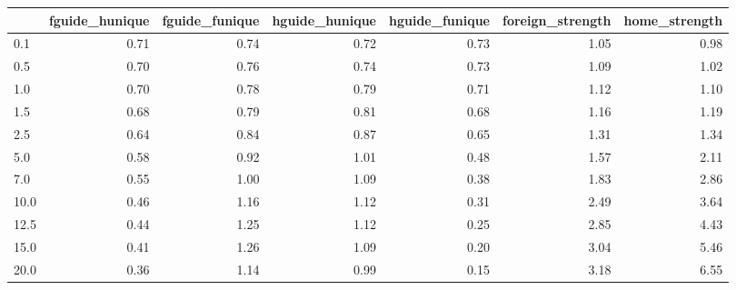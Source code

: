\begin{tabular}{lrrrrrr}
\toprule
 & fguide_hunique & fguide_funique & hguide_hunique & hguide_funique & foreign_strength & home_strength \\
\midrule
0.1 & 0.71 & 0.74 & 0.72 & 0.73 & 1.05 & 0.98 \\
0.5 & 0.70 & 0.76 & 0.74 & 0.73 & 1.09 & 1.02 \\
1.0 & 0.70 & 0.78 & 0.79 & 0.71 & 1.12 & 1.10 \\
1.5 & 0.68 & 0.79 & 0.81 & 0.68 & 1.16 & 1.19 \\
2.5 & 0.64 & 0.84 & 0.87 & 0.65 & 1.31 & 1.34 \\
5.0 & 0.58 & 0.92 & 1.01 & 0.48 & 1.57 & 2.11 \\
7.0 & 0.55 & 1.00 & 1.09 & 0.38 & 1.83 & 2.86 \\
10.0 & 0.46 & 1.16 & 1.12 & 0.31 & 2.49 & 3.64 \\
12.5 & 0.44 & 1.25 & 1.12 & 0.25 & 2.85 & 4.43 \\
15.0 & 0.41 & 1.26 & 1.09 & 0.20 & 3.04 & 5.46 \\
20.0 & 0.36 & 1.14 & 0.99 & 0.15 & 3.18 & 6.55 \\
\bottomrule
\end{tabular}
